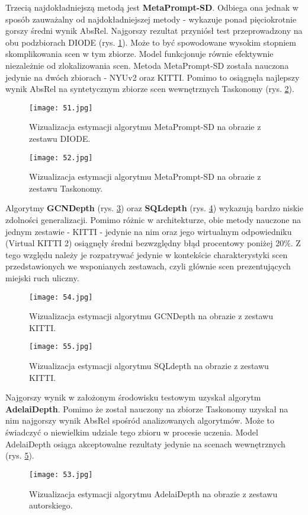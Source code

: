 Trzecią najdokładniejszą metodą jest \textbf{MetaPrompt-SD}. Odbiega ona jednak w sposób zauważalny od najdokładniejszej metody - wykazuje ponad pięciokrotnie gorszy średni wynik AbsRel. Najgorszy rezultat przyniósł test przeprowadzony na obu podzbiorach DIODE (rys. \ref{fig:metaprompt-diode}). Może to być spowodowane wysokim stopniem skomplikowania scen w tym zbiorze. Model funkcjonuje równie efektywnie niezależnie od zlokalizowania scen. Metoda MetaPrompt-SD została nauczona jedynie na dwóch zbiorach - NYUv2 oraz KITTI. Pomimo to osiągnęła najlepszy wynik AbsRel na syntetycznym zbiorze scen wewnętrznych Taskonomy (rys. \ref{fig:metaprompt-taskonomy}).
\begin{figure}[H]
    \centering
    \texttt{[image: 51.jpg]}
    \caption{Wizualizacja estymacji algorytmu MetaPrompt-SD na obrazie z zestawu DIODE.}
    \label{fig:metaprompt-diode}
\end{figure}
\begin{figure}[H]
    \centering
    \texttt{[image: 52.jpg]}
    \caption{Wizualizacja estymacji algorytmu MetaPrompt-SD na obrazie z zestawu Taskonomy.}
    \label{fig:metaprompt-taskonomy}
\end{figure}

Algorytmy \textbf{GCNDepth} (rys. \ref{fig:GCNDepth-KITTI}) oraz \textbf{SQLdepth} (rys. \ref{fig:SQLdepth-KITTI}) wykazują bardzo niskie zdolności generalizacji. Pomimo różnic w architekturze, obie metody nauczone na jednym zestawie - KITTI - jedynie na nim oraz jego wirtualnym odpowiedniku (Virtual KITTI 2) osiągnęły średni bezwzględny błąd procentowy poniżej 20\%. Z tego względu należy je rozpatrywać jedynie w kontekście charakterystyki scen przedstawionych we wsponianych zestawach, czyli głównie scen prezentujących miejski ruch uliczny.
\begin{figure}[H]
    \centering
    \texttt{[image: 54.jpg]}
    \caption{Wizualizacja estymacji algorytmu GCNDepth na obrazie z zestawu KITTI.}
    \label{fig:GCNDepth-KITTI}
\end{figure}
\begin{figure}[H]
    \centering
    \texttt{[image: 55.jpg]}
    \caption{Wizualizacja estymacji algorytmu SQLdepth na obrazie z zestawu KITTI.}
    \label{fig:SQLdepth-KITTI}
\end{figure}

Najgorszy wynik w założonym środowisku testowym uzyskał algorytm \textbf{AdelaiDepth}. Pomimo że został nauczony na zbiorze Taskonomy uzyskał na nim najgorszy wynik AbsRel spośród analizowanych algorytmów. Może to świadczyć o niewielkim udziale tego zbioru w procesie uczenia. Model AdelaiDepth osiąga akceptowalne rezultaty jedynie na scenach wewnętrznych (rys. \ref{fig:adelaidepth-stray}).
\begin{figure}[H]
    \centering
    \texttt{[image: 53.jpg]}
    \caption{Wizualizacja estymacji algorytmu AdelaiDepth na obrazie z zestawu autorskiego.}
    \label{fig:adelaidepth-stray}
\end{figure}

